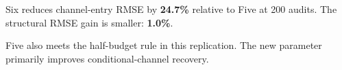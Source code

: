 Six reduces channel-entry RMSE by \textbf{24.7\%} relative to Five at 200 audits. The structural RMSE gain is smaller: \textbf{1.0\%}.\par\vspace{3mm}
Five also meets the half-budget rule in this replication. The new parameter primarily improves conditional-channel recovery.
